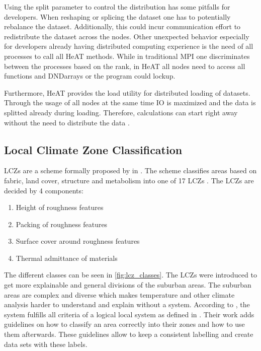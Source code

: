 Using the split parameter to control the distribution has some pitfalls for developers.
When reshaping or splicing the dataset one has to potentially rebalance the dataset. Additionally, this could incur communication effort
to redistribute the dataset across the nodes.
Other unexpected behavior especially for developers already having distributed computing experience is the need of all processes to call all \gls{HeAT} methods.
While in traditional \gls{MPI} one discriminates between the processes based on the rank, in \gls{HeAT} all nodes need to access all functions and \glspl{DNDarray} or the
program could lockup.

Furthermore, \gls{HeAT} provides the load utility for distributed loading of datasets. Through the usage of all nodes at the same time \gls{IO} is maximized and the data
is splitted already during loading. Therefore, calculations can start right away without the need to distribute the data
\cite{krajsek_helmholtz_nodate}.


\subsection{Local Climate Zone Classification}
\label{subsec:local_climate_zone_classification}

\glspl{LCZ} are a scheme formally proposed by \citeauthor{stewart_local_2012} in \cite{stewart_local_2012}. The scheme classifies areas based on fabric, land cover, structure
and metabolism into one of 17 \gls{LCZ}s \cite{xue_applications_2020}.
The \gls{LCZ}s are decided by 4 components:
\begin{enumerate}
  \item Height of roughness features
  \item Packing of roughness features
  \item Surface cover around roughness features
  \item Thermal admittance of materials
\end{enumerate}
The different classes can be seen in \cref{fig:lcz_classes}.
The \glspl{LCZ} were introduced to get more explainable and general divisions of the suburban areas.
The suburban areas are complex and diverse which makes temperature and other climate analysis harder
to understand and explain without a system.
According to \citeauthor{stewart_local_2012}, the system fulfills all criteria of a logical local system as defined in \cite{grigg_logic_1965}.
Their work adds guidelines on how to classify an area correctly into their zones and how to use them afterwards.
These guidelines allow to keep a consistent labelling and create data sets with these labels.


